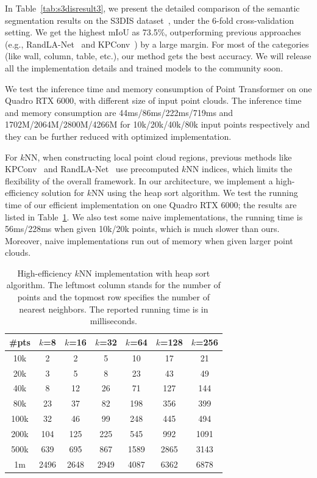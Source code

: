 In Table~\ref{tab:s3disresult3}, we present the detailed comparison of the semantic segmentation results on the S3DIS dataset~\cite{armeni2016s3dis}, under the 6-fold cross-validation setting. We get the highest mIoU as 73.5\%, outperforming previous approaches (e.g., RandLA-Net~\cite{hu2020randla} and KPConv~\cite{thomas2019kpconv}) by a large margin. For most of the categories (like wall, column, table, etc.), our method gets the best accuracy. We will release all the implementation details and trained models to the community soon.

We test the inference time and memory consumption of Point Transformer on one Quadro RTX 6000, with different size of input point clouds. The inference time and memory consumption are 44ms/86ms/222ms/719ms and 1702M/2064M/2800M/4266M for 10k/20k/40k/80k input points respectively and they can be further reduced with optimized implementation.

For $k$NN, when constructing local point cloud regions, previous methods like KPConv~\cite{thomas2019kpconv} and RandLA-Net~\cite{hu2020randla} use precomputed $k$NN indices, which limits the flexibility of the overall framework. In our architecture, we implement a high-efficiency solution for $k$NN using the heap sort algorithm. We test the running time of our efficient implementation on one Quadro RTX 6000; the results are listed in Table~\ref{tab:knn}. We also test some naive implementations, the running time is 56ms/228ms when given 10k/20k points, which is much slower than ours. Moreover, naive implementations run out of memory when given larger point clouds.

\begin{table}
	\centering
	\begin{tabular}{ c | c c c c c c}
		\toprule[1pt]
		\#pts & $k$=8 & $k$=16 & $k$=32 & $k$=64 & $k$=128 & $k$=256 \\
		\hline
		10k & 2 & 2 & 5  & 10 & 17 & 21 \\
		20k & 3 & 5 & 8  & 23 & 43 & 49 \\
		40k & 8 & 12 & 26  & 71 & 127 & 144 \\
		80k & 23 & 37 & 82  & 198 & 356 & 399 \\
		100k & 32 & 46 & 99 & 248 & 445 & 494 \\
		200k & 104 & 125 & 225 & 545 & 992 & 1091 \\
		500k & 639 & 695 & 867 & 1589 & 2865 & 3143 \\
		1m & 2496 & 2648 & 2949 & 4087 & 6362 & 6878 \\
		\bottomrule[1pt]
	\end{tabular}
	\caption{High-efficiency $k$NN implementation with heap sort algorithm. The leftmost column stands for the number of points and the topmost row specifies the number of nearest neighbors. The reported running time is in milliseconds.}
	\label{tab:knn}
\end{table}